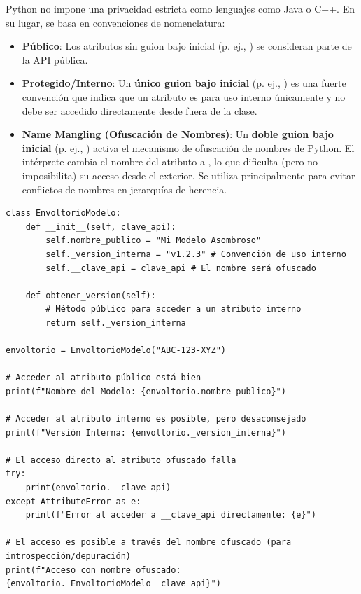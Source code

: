 Python no impone una privacidad estricta como lenguajes como Java o C++. En su lugar, se basa en convenciones de nomenclatura:
\begin{itemize}
    \item \textbf{Público}: Los atributos sin guion bajo inicial (p. ej., ) se consideran parte de la API pública.
    \item \textbf{Protegido/Interno}: Un \textbf{único guion bajo inicial} (p. ej., ) es una fuerte convención que indica que un atributo es para uso interno únicamente y no debe ser accedido directamente desde fuera de la clase.
    \item \textbf{Name Mangling (Ofuscación de Nombres)}: Un \textbf{doble guion bajo inicial} (p. ej., ) activa el mecanismo de ofuscación de nombres de Python. El intérprete cambia el nombre del atributo a , lo que dificulta (pero no imposibilita) su acceso desde el exterior. Se utiliza principalmente para evitar conflictos de nombres en jerarquías de herencia.
\end{itemize}

\begin{example}
\text{ }\begin{verbatim}
class EnvoltorioModelo:
    def __init__(self, clave_api):
        self.nombre_publico = "Mi Modelo Asombroso"
        self._version_interna = "v1.2.3" # Convención de uso interno
        self.__clave_api = clave_api # El nombre será ofuscado

    def obtener_version(self):
        # Método público para acceder a un atributo interno
        return self._version_interna

envoltorio = EnvoltorioModelo("ABC-123-XYZ")

# Acceder al atributo público está bien
print(f"Nombre del Modelo: {envoltorio.nombre_publico}")

# Acceder al atributo interno es posible, pero desaconsejado
print(f"Versión Interna: {envoltorio._version_interna}")

# El acceso directo al atributo ofuscado falla
try:
    print(envoltorio.__clave_api)
except AttributeError as e:
    print(f"Error al acceder a __clave_api directamente: {e}")

# El acceso es posible a través del nombre ofuscado (para introspección/depuración)
print(f"Acceso con nombre ofuscado: {envoltorio._EnvoltorioModelo__clave_api}")
\end{verbatim}
\end{example}

